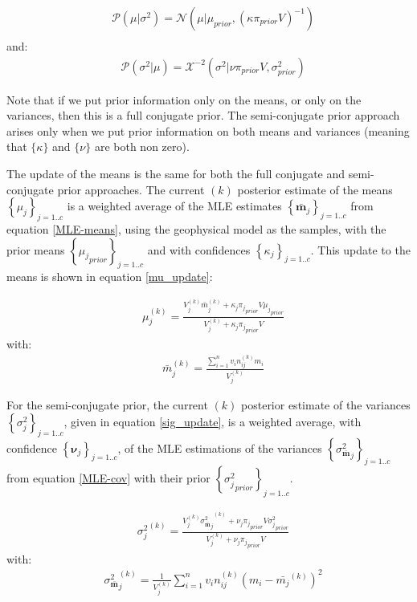 \documentclass[extra]{gji} %
\begin{document}
\begin{align}
&\mathcal{P}({\mu}| \sigma^2) = \mathcal{N}({\mu}|{\mu}_{prior}, ({\kappa}\pi_{prior}V)^{-1}) \label{mu_semiprior} \\
\end{align}
and:
\begin{align}
&\mathcal{P}(\sigma^2|{\mu}) = \mathcal{X}^{-2}(\sigma^2|{\nu}{\pi}_{prior}V,\sigma_{prior}^2) \label{sigma_semiprior}
\end{align}

Note that if we put prior information only on the means, or only on the variances, then this is a full conjugate prior. The semi-conjugate prior approach arises only when we put prior information on both means and variances (meaning that $\{\kappa\}$ and $\{\nu\}$ are both non zero).

The update of the means is the same for both the full conjugate and semi-conjugate prior approaches. The current $(k)$ posterior estimate of the means $\left\{{\mu}_j\right\}_{j=1..c}$ is a weighted average of the MLE estimates $\left\{\bar{\mathbf{m}}_j\right\}_{j=1..c}$ from equation \ref{MLE-means}, using the geophysical model as the samples, with the prior means $\left\{{{\mu}_j}_{prior}\right\}_{j=1..c}$ and with confidences $\left\{\kappa_j\right\}_{j=1..c}$. This update to the means is shown in equation \ref{mu_update}:

\begin{align}
&{\mu}^{(k)}_j=\frac{V_{j}^{(k)}{\bar{{m}}}_j^{(k)} + \kappa_j {\pi_j}_{prior} V {{\mu}_j}_{prior}}{V_{j}^{(k)}+\kappa_j {\pi_j}_{prior} V} \label{mu_update}
\end{align}
with:
\begin{align}
&{\bar{{m}}}_j^{(k)} = \frac{\sum^n_{i=1} v_i n_{ij}^{(k)} {m}_i}{V_{j}^{(k)}}
\end{align}


For the semi-conjugate prior, the current $(k)$ posterior estimate of the variances $\left\{{\sigma_j^2}\right\}_{j=1..c}$, given in equation \ref{sig_update}, is a weighted average, with confidence $\left\{\mathbf{\nu}_j\right\}_{j=1..c}$, of the MLE estimations of the variances $\left\{{\sigma^2_{\bar{\mathbf{m}}}}_j\right\}_{j=1..c}$ from equation \ref{MLE-cov} with their prior $\left\{{\sigma_j^2}_{prior}\right\}_{j=1..c}$.

\begin{align}
&{\sigma_j^2}^{(k)} = \frac{{{V_{j}^{(k)}} {\sigma^2_{\bar{\mathbf{m}}}}_j}^{(k)} + \nu_j {\pi_j}_{prior} V {\sigma_j^2}_{prior}}
{{V_{j}^{(k)}} + \nu_j {\pi_j}_{prior} V} \label{sig_update}
\end{align}
with:
\begin{align}
&{\sigma^2_{\bar{\mathbf{m}}}}_j^{(k)} =\frac{1}{{V_{j}^{(k)}}} \sum_{i=1}^{n} v_i n_{ij}^{(k)}({m}_i-\bar{{m}_j}^{(k)})^2
\end{align}
\end{document}

